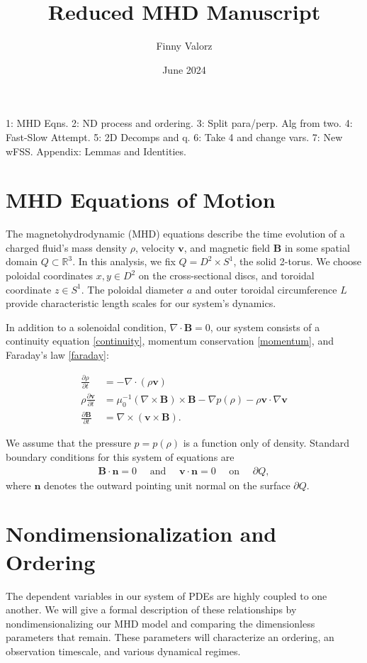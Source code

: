 \documentclass{article}
\title{Reduced MHD Manuscript}
\author{Finny Valorz}
\date{June 2024}
\newcommand{\p}{\partial}
\newcommand{\deriv}[2]{\frac{\p #1}{\p #2}}
\newcommand{\pth} [1] {\left( #1 \right) }
\begin{document}
\maketitle



1: MHD Eqns. 2: ND process and ordering. 3: Split para/perp. Alg from two. 4: Fast-Slow Attempt. 5: 2D Decomps and q. 6: Take 4 and change vars. 7: New wFSS. Appendix: Lemmas and Identities. 

\section{MHD Equations of Motion} 
The magnetohydrodynamic (MHD) equations describe the time evolution of a charged fluid's mass density $\rho$, velocity $\bm{v}$, and magnetic field $\bm{B}$ in some spatial domain $Q\subset \mathbb{R}^3$. In this analysis, we fix $Q=D^2\times S^1$, the solid 2-torus. We choose poloidal coordinates $x,y\in D^2$ on the cross-sectional discs, and toroidal coordinate $z \in S^1$. The poloidal diameter $a$ and outer toroidal circumference $L$ provide characteristic length scales for our system's dynamics. 

In addition to a solenoidal condition, $\nabla\cdot \bm{B}=0$, our system consists of a continuity equation \eqref{continuity}, momentum conservation \eqref{momentum}, and Faraday's law \eqref{faraday}:

\begin{align}
    \deriv{\rho}{t} &= -\nabla\cdot \pth{\rho \bm{v}} \label{continuity} \\ 
    \rho\deriv{\bm{v}}{t} &= \mu_0^{-1} \pth{\nabla\times \bm{B}} \times \bm{B} - \nabla p(\rho) - \rho \bm{v}\cdot\nabla \bm{v} \label{momentum} \\ 
    \deriv{\bm{B}}{t} &= \nabla \times \pth{\bm{v}\times \bm{B}}. \label{faraday}
\end{align}

We assume that the pressure $p=p(\rho)$ is a function only of density. Standard boundary conditions for this system of equations are
\begin{align*} 
    \bm{B}\cdot \bm{n} = 0 \quad \text{ and }\quad  \bm{v}\cdot \bm{n} = 0 \quad \text{ on }\quad \p Q,
\end{align*}
where $\bm{n}$ denotes the outward pointing unit normal on the surface $\p Q$. 



\section{Nondimensionalization and Ordering} 
The dependent variables in our system of PDEs are highly coupled to one another. We will give a formal description of these relationships by nondimensionalizing our MHD model and comparing the dimensionless parameters that remain. These parameters will characterize an ordering, an observation timescale, and various dynamical regimes. 
\end{document}
